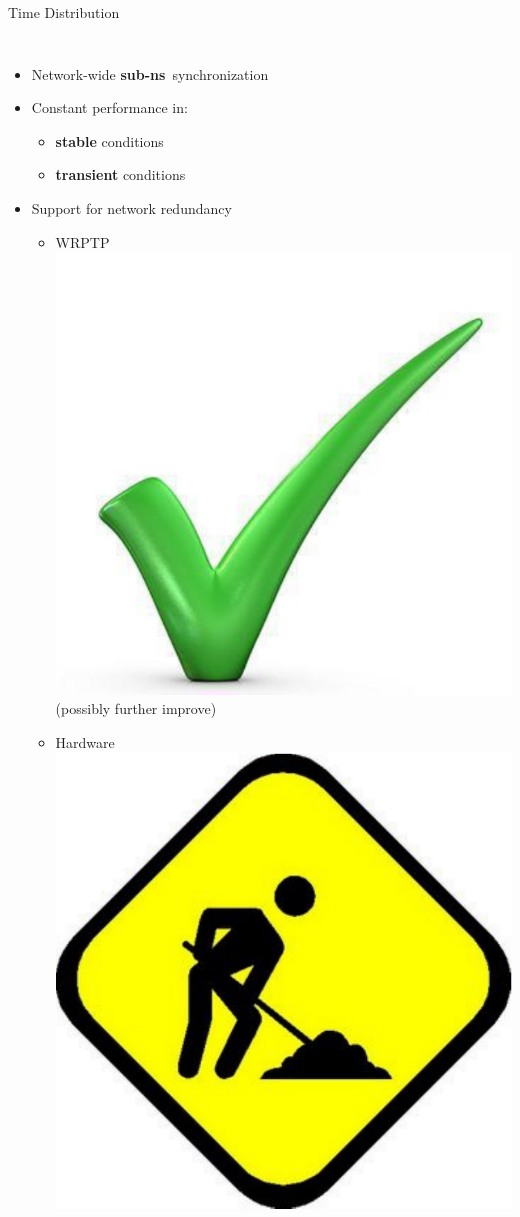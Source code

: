 \documentclass[compress,red]{beamer}
\begin{document}
\begin{frame}{Time Distribution}

  \begin{columns}[c]

  \begin{itemize}
    \item Network-wide {\bf sub-ns}~synchronization
    \vspace{0.3cm}
    \item Constant performance in:
	\begin{itemize}
	  \item {\bf stable} conditions
	  \item {\bf transient} conditions
	\end{itemize}
    \vspace{0.3cm}
    \item Support for network redundancy
    \begin{itemize}
      \item WRPTP \includegraphics[width=.5cm]{misc/big-tick.pdf}  (possibly further improve)
      \item Hardware \includegraphics[width=.5cm]{misc/underconstruction.pdf}
    \end{itemize}
  \end{itemize}



\end{columns}
\end{frame}
\end{document}
